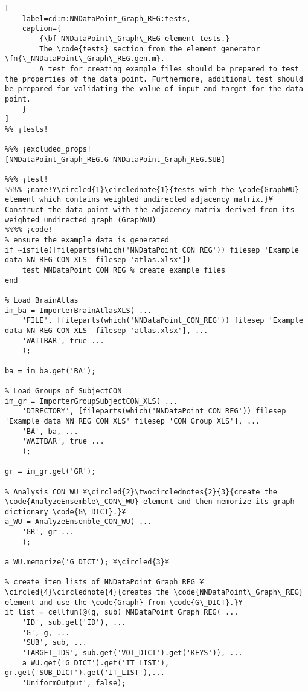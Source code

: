 \documentclass{tufte-handout}
\begin{document}
\begin{lstlisting}[
	label=cd:m:NNDataPoint_Graph_REG:tests,
	caption={
		{\bf NNDataPoint\_Graph\_REG element tests.}
		The \code{tests} section from the element generator \fn{\_NNDataPoint\_Graph\_REG.gen.m}.
		A test for creating example files should be prepared to test the properties of the data point. Furthermore, additional test should be prepared for validating the value of input and target for the data point.
	}
]		
%% ¡tests!

%%% ¡excluded_props!
[NNDataPoint_Graph_REG.G NNDataPoint_Graph_REG.SUB]

%%% ¡test!
%%%% ¡name!¥\circled{1}\circlednote{1}{tests with the \code{GraphWU} element which contains weighted undirected adjacency matrix.}¥
Construct the data point with the adjacency matrix derived from its weighted undirected graph (GraphWU) 
%%%% ¡code!
% ensure the example data is generated
if ~isfile([fileparts(which('NNDataPoint_CON_REG')) filesep 'Example data NN REG CON XLS' filesep 'atlas.xlsx'])
    test_NNDataPoint_CON_REG % create example files
end

% Load BrainAtlas
im_ba = ImporterBrainAtlasXLS( ...
    'FILE', [fileparts(which('NNDataPoint_CON_REG')) filesep 'Example data NN REG CON XLS' filesep 'atlas.xlsx'], ...
    'WAITBAR', true ...
    );

ba = im_ba.get('BA');

% Load Groups of SubjectCON
im_gr = ImporterGroupSubjectCON_XLS( ...
    'DIRECTORY', [fileparts(which('NNDataPoint_CON_REG')) filesep 'Example data NN REG CON XLS' filesep 'CON_Group_XLS'], ...
    'BA', ba, ...
    'WAITBAR', true ...
    );

gr = im_gr.get('GR');

% Analysis CON WU ¥\circled{2}\twocirclednotes{2}{3}{create the \code{AnalyzeEnsemble\_CON\_WU} element and then memorize its graph dictionary \code{G\_DICT}.}¥
a_WU = AnalyzeEnsemble_CON_WU( ...
    'GR', gr ...
    );

a_WU.memorize('G_DICT'); ¥\circled{3}¥

% create item lists of NNDataPoint_Graph_REG ¥\circled{4}\circlednote{4}{creates the \code{NNDataPoint\_Graph\_REG} element and use the \code{Graph} from \code{G\_DICT}.}¥
it_list = cellfun(@(g, sub) NNDataPoint_Graph_REG( ...
    'ID', sub.get('ID'), ...
    'G', g, ...
    'SUB', sub, ...
    'TARGET_IDS', sub.get('VOI_DICT').get('KEYS')), ...
    a_WU.get('G_DICT').get('IT_LIST'), gr.get('SUB_DICT').get('IT_LIST'),...
    'UniformOutput', false);


\end{lstlisting}
\end{document}
